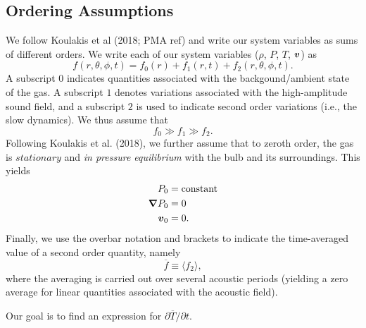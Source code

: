 \subsection{Ordering Assumptions}
We follow Koulakis et al (2018; PMA ref) and write our system variables as sums of different orders.  We write each of our system variables ($\rho$, $P$, $T$, $\boldsymbol{v}$) as
\begin{equation}
f(r,\theta,\phi,t) = f_0(r) + f_1(r,t) + f_2(r,\theta,\phi,t).
\end{equation}
A subscript $0$ indicates quantities associated with the backgound/ambient state of the gas.  A subscript $1$ denotes variations associated with the high-amplitude sound field, and a subscript $2$ is used to indicate second order variations (i.e., the slow dynamics).  We thus assume that
\begin{equation}
f_0 \gg f_1 \gg f_2.
\end{equation}
Following Koulakis et al. (2018), we further assume that to zeroth order, the gas is $stationary$ and \textit{in pressure equilibrium} with the bulb and its surroundings.  This yields
\begin{align}
P_0 &= \mathrm{constant} \\ 
\boldsymbol{\nabla} P_0 &= 0 \\
\boldsymbol{v}_0 &= 0.
\end{align}
Finally, we use the overbar notation and brackets to indicate the time-averaged value of a second order quantity, namely
\begin{equation}
\overline{f} \equiv \langle f_2 \rangle,
\end{equation}
where the averaging is carried out over several acoustic periods (yielding a zero average for linear quantities associated with the acoustic field).

Our goal is to find an expression for $\partial\overline{T}/\partial t$.

